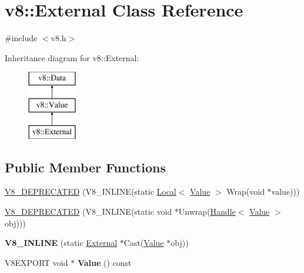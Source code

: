 \hypertarget{classv8_1_1_external}{}\section{v8\+:\+:External Class Reference}
\label{classv8_1_1_external}


{\ttfamily \#include $<$v8.\+h$>$}

Inheritance diagram for v8\+:\+:External\+:\begin{figure}[H]
\begin{center}
\leavevmode
\includegraphics[height=3.000000cm]{classv8_1_1_external}
\end{center}
\end{figure}
\subsection*{Public Member Functions}
\begin{DoxyCompactItemize}
\item 
\hyperlink{classv8_1_1_external_a6d9451cdca76110fd9a972480cbee37d}{V8\+\_\+\+D\+E\+P\+R\+E\+C\+A\+T\+E\+D} (V8\+\_\+\+I\+N\+L\+I\+N\+E(static \hyperlink{classv8_1_1_local}{Local}$<$ \hyperlink{classv8_1_1_value}{Value} $>$ Wrap(void $\ast$value)))
\item 
\hyperlink{classv8_1_1_external_aa07bb6176354067d21965515c1d988f2}{V8\+\_\+\+D\+E\+P\+R\+E\+C\+A\+T\+E\+D} (V8\+\_\+\+I\+N\+L\+I\+N\+E(static void $\ast$Unwrap(\hyperlink{classv8_1_1_handle}{Handle}$<$ \hyperlink{classv8_1_1_value}{Value} $>$ obj)))
\item 
\hypertarget{classv8_1_1_external_aa1d750d608a80332bcc7a8d92a3af201}{}{\bfseries V8\+\_\+\+I\+N\+L\+I\+N\+E} (static \hyperlink{classv8_1_1_external}{External} $\ast$Cast(\hyperlink{classv8_1_1_value}{Value} $\ast$obj))\label{classv8_1_1_external_aa1d750d608a80332bcc7a8d92a3af201}

\item 
\hypertarget{classv8_1_1_external_a17d89761a1fa35f7b526c3e1305738d1}{}V8\+E\+X\+P\+O\+R\+T void $\ast$ {\bfseries Value} () const \label{classv8_1_1_external_a17d89761a1fa35f7b526c3e1305738d1}

\end{DoxyCompactItemize}
